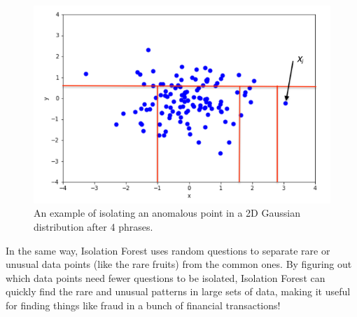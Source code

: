 \begin{figure}
  \centering
  \includegraphics[width=\linewidth]{body/02_methodology/img/figure4.png}
  \caption{An example of isolating an anomalous point in a 2D Gaussian distribution after 4 phrases.}
\end{figure}

In the same way, Isolation Forest uses random questions to separate rare or unusual data points (like the rare fruits) from the common ones. By figuring out which data points need fewer questions to be isolated, Isolation Forest can quickly find the rare and unusual patterns in large sets of data, making it useful for finding things like fraud in a bunch of financial transactions!
